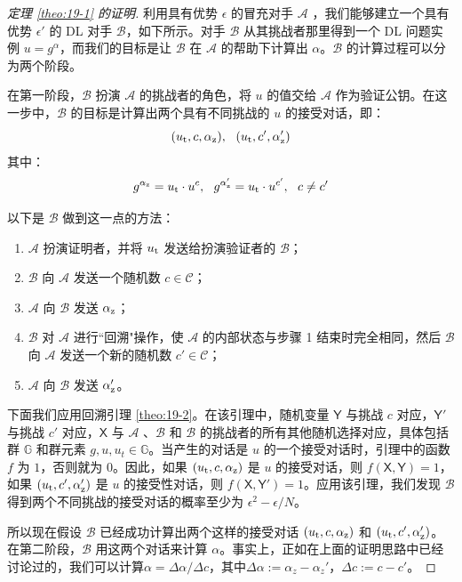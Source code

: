 \begin{proof}[定理 \ref{theo:19-1} 的证明]
	利用具有优势 $\epsilon$ 的冒充对手 $\mathcal{A}$ ，我们能够建立一个具有优势 $\epsilon'$ 的 DL 对手 $\mathcal{B}$，如下所示。对手 $\mathcal{B}$ 从其挑战者那里得到一个 DL 问题实例 $u = g^\alpha$，而我们的目标是让 $\mathcal{B}$ 在 $\mathcal{A}$ 的帮助下计算出 $\alpha$。$\mathcal{B}$ 的计算过程可以分为两个阶段。

在第一阶段，$\mathcal{B}$ 扮演 $\mathcal{A}$ 的挑战者的角色，将 $u$ 的值交给 $\mathcal{A}$ 作为验证公钥。在这一步中，$\mathcal{B}$ 的目标是计算出两个具有不同挑战的 $u$ 的接受对话，即：
$$(u_{\rm t},c,\alpha_{\rm z}),~~(u_{\rm t},c',\alpha_{\rm z}')$$
其中：
$$g^{\alpha_{\rm z}}=u_{\rm t}\cdot u^c,~~
g^{\alpha_{\rm z}'}=u_{\rm t}\cdot u^{c'},~~
c\neq c'$$

以下是 $\mathcal{B}$ 做到这一点的方法：
\begin{enumerate}
	\item $\mathcal{A}$ 扮演证明者，并将 $u_{\rm t}$ 发送给扮演验证者的 $\mathcal{B}$；
	\item $\mathcal{B}$ 向 $\mathcal{A}$ 发送一个随机数 $c\in\mathcal{C}$；
	\item $\mathcal{A}$ 向 $\mathcal{B}$ 发送 $\alpha_{\rm z}$；
	\item $\mathcal{B}$ 对 $\mathcal{A}$ 进行``回溯"操作，使 $\mathcal{A}$ 的内部状态与步骤 1 结束时完全相同，然后 $\mathcal{B}$ 向 $\mathcal{A}$ 发送一个新的随机数 $c'\in\mathcal{C}$；
	\item $\mathcal{A}$ 向 $\mathcal{B}$ 发送 $\alpha_{\rm z}'$。
\end{enumerate}
下面我们应用回溯引理 \ref{theo:19-2}。在该引理中，随机变量 $\mathsf{Y}$ 与挑战 $c$ 对应，$\mathsf{Y}'$ 与挑战 $c'$ 对应，$\mathsf{X}$ 与 $\mathcal{A}$ 、$\mathcal{B}$ 和 $\mathcal{B}$ 的挑战者的所有其他随机选择对应，具体包括群 $\mathbb{G}$ 和群元素 $g,u,u_t\in\mathbb{G}$。当产生的对话是 $u$ 的一个接受对话时，引理中的函数 $f$ 为 $1$，否则就为 $0$。因此，如果 $(u_{\rm t},c,\alpha_{\rm z})$ 是 $u$ 的接受对话，则 $f(\mathsf{X},\mathsf{Y})=1$，如果 $(u_{\rm t},c',\alpha_{\rm z}')$ 是 $u$ 的接受性对话，则 $f(\mathsf{X},\mathsf{Y}')=1$。应用该引理，我们发现 $\mathcal{B}$ 得到两个不同挑战的接受对话的概率至少为 $\epsilon^2-{\epsilon}/{N}$。

所以现在假设 $\mathcal{B}$ 已经成功计算出两个这样的接受对话 $(u_{\rm t},c,\alpha_{\rm z})$ 和 $(u_{\rm t},c',\alpha_{\rm z}')$。在第二阶段，$\mathcal{B}$ 用这两个对话来计算 $\alpha$。事实上，正如在上面的证明思路中已经讨论过的，我们可以计算$\alpha={\Delta\alpha}/{\Delta c}$，其中$\Delta\alpha:=\alpha_z-\alpha_z'$，$\Delta c:=c-c'$。


\end{proof}
